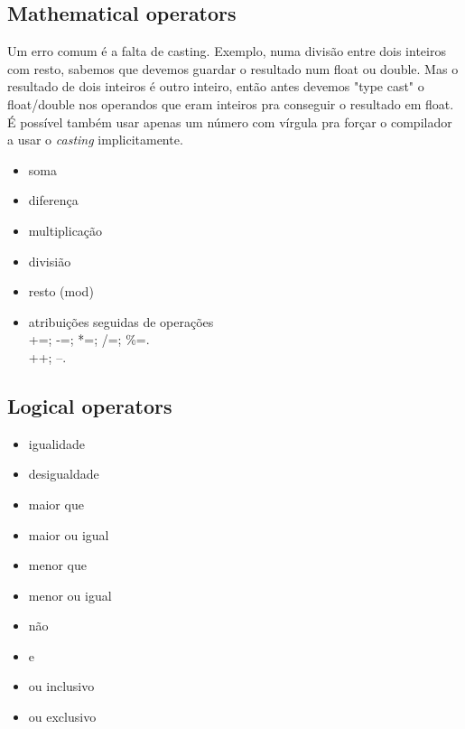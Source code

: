 \documentclass[12pt,a4paper]{article} %
\begin{document}
\subsection{Mathematical operators}
Um erro comum é a falta de casting. Exemplo, numa divisão entre dois inteiros com resto, sabemos que devemos guardar o resultado num float ou double. Mas o resultado de dois inteiros é outro inteiro, então antes devemos "type cast" o float/double nos operandos que eram inteiros pra conseguir o resultado em float. É possível também usar apenas um número com vírgula pra forçar o compilador a usar o \textit{casting} implicitamente.
\begin{itemize}
\item soma
\item diferença
\item multiplicação
\item divisião
\item resto (mod)
\item atribuições seguidas de operações\\+=; -=; *=; /=; \%=.\\++; --.
\end{itemize}

\subsection{Logical operators}
\begin{itemize}
\item igualidade
\item desigualdade
\item maior que
\item maior ou igual
\item menor que
\item menor ou igual
\item não
\item e
\item ou inclusivo
\item ou exclusivo
\end{itemize}
\end{document}
